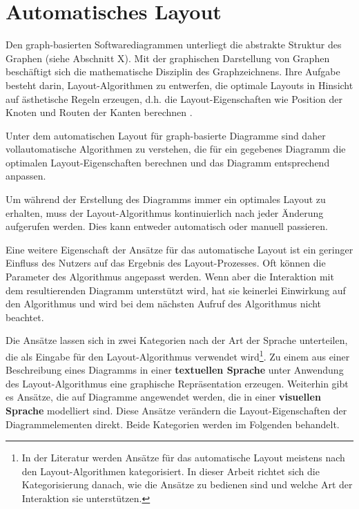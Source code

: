
\section{Automatisches Layout}
\label{sec:automatic-layout}

Den graph-basierten Softwarediagrammen unterliegt die abstrakte Struktur des Graphen (siehe Abschnitt X). Mit der graphischen Darstellung von Graphen beschäftigt sich die mathematische Disziplin des Graphzeichnens. Ihre Aufgabe besteht darin, Layout-Algorithmen zu entwerfen, die optimale Layouts in Hinsicht auf ästhetische Regeln erzeugen, d.h. die Layout-Eigenschaften wie Position der Knoten und Routen der Kanten berechnen \cite{Eichelberger05Aesthetics, Arvo02Techniques, Siebenhaller03Automatisches}.

Unter dem automatischen Layout für graph-basierte Diagramme sind daher vollautomatische Algorithmen zu verstehen, die für ein gegebenes Diagramm die optimalen Layout-Eigenschaften berechnen und das Diagramm entsprechend anpassen.

Um während der Erstellung des Diagramms immer ein optimales Layout zu erhalten, muss der Layout-Algorithmus kontinuierlich nach jeder Änderung aufgerufen werden. Dies kann entweder automatisch oder manuell passieren.

Eine weitere Eigenschaft der Ansätze für das automatische Layout ist ein geringer Einfluss des Nutzers auf das Ergebnis des Layout-Prozesses. Oft können die Parameter des Algorithmus angepasst werden. Wenn aber die Interaktion mit dem resultierenden Diagramm unterstützt wird, hat sie keinerlei Einwirkung auf den Algorithmus und wird bei dem nächsten Aufruf des Algorithmus nicht beachtet.

Die Ansätze lassen sich in zwei Kategorien nach der Art der Sprache unterteilen, die als Eingabe für den Layout-Algorithmus verwendet wird\footnote{In der Literatur werden Ansätze für das automatische Layout meistens nach den Layout-Algorithmen kategorisiert. In dieser Arbeit richtet sich die Kategorisierung danach, wie die Ansätze zu bedienen sind und welche Art der Interaktion sie unterstützen.}. Zu einem aus einer Beschreibung eines Diagramms in einer \textbf{textuellen Sprache} unter Anwendung des Layout-Algorithmus eine graphische Repräsentation erzeugen. Weiterhin gibt es Ansätze, die auf Diagramme angewendet werden, die in einer \textbf{visuellen Sprache} modelliert sind. Diese Ansätze verändern die Layout-Eigenschaften der Diagrammelementen direkt. Beide Kategorien werden im Folgenden behandelt.

